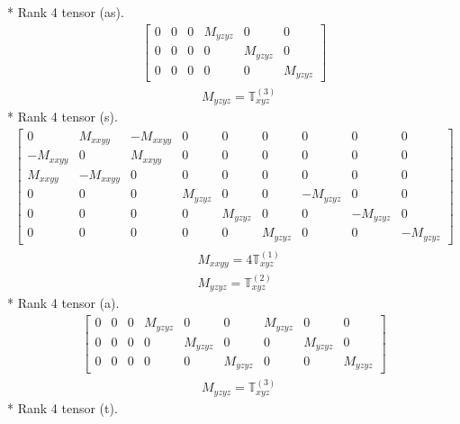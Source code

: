 \documentclass[fleqn,8pt,landscape]{jsarticle}
\begin{document}
* Rank 4 tensor (as).
\begin{align*}
\begin{bmatrix} 0 & 0 & 0 & M_{yzyz} & 0 & 0 \\ 0 & 0 & 0 & 0 & M_{yzyz} & 0 \\ 0 & 0 & 0 & 0 & 0 & M_{yzyz} \end{bmatrix}
\end{align*}
\begin{align*}
& M_{yzyz} = \mathbb{T}_{xyz}^{(3)}
\end{align*}
* Rank 4 tensor (s).
\begin{align*}
\begin{bmatrix} 0 & M_{xxyy} & - M_{xxyy} & 0 & 0 & 0 & 0 & 0 & 0 \\ - M_{xxyy} & 0 & M_{xxyy} & 0 & 0 & 0 & 0 & 0 & 0 \\ M_{xxyy} & - M_{xxyy} & 0 & 0 & 0 & 0 & 0 & 0 & 0 \\ 0 & 0 & 0 & M_{yzyz} & 0 & 0 & - M_{yzyz} & 0 & 0 \\ 0 & 0 & 0 & 0 & M_{yzyz} & 0 & 0 & - M_{yzyz} & 0 \\ 0 & 0 & 0 & 0 & 0 & M_{yzyz} & 0 & 0 & - M_{yzyz} \end{bmatrix}
\end{align*}
\begin{align*}
& M_{xxyy} = 4 \mathbb{T}_{xyz}^{(1)} \\
& M_{yzyz} = \mathbb{T}_{xyz}^{(2)}
\end{align*}
* Rank 4 tensor (a).
\begin{align*}
\begin{bmatrix} 0 & 0 & 0 & M_{yzyz} & 0 & 0 & M_{yzyz} & 0 & 0 \\ 0 & 0 & 0 & 0 & M_{yzyz} & 0 & 0 & M_{yzyz} & 0 \\ 0 & 0 & 0 & 0 & 0 & M_{yzyz} & 0 & 0 & M_{yzyz} \end{bmatrix}
\end{align*}
\begin{align*}
& M_{yzyz} = \mathbb{T}_{xyz}^{(3)}
\end{align*}
* Rank 4 tensor (t).
\end{document}
